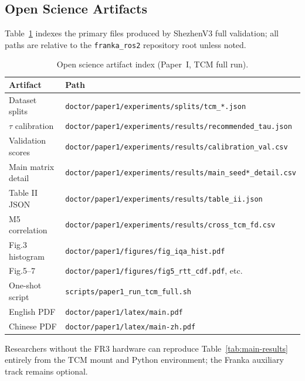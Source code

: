 \subsection{Open Science Artifacts}
\label{sec:artifacts}

Table~\ref{tab:artifacts} indexes the primary files produced by ShezhenV3 full validation; all paths are relative to the \texttt{franka\_ros2} repository root unless noted.

\begin{table}[t]
\centering
\caption{Open science artifact index (Paper~I, TCM full run).}
\label{tab:artifacts}
\scriptsize
\begin{tabular}{ll}
\hline
Artifact & Path \\
\hline
Dataset splits & \texttt{doctor/paper1/experiments/splits/tcm\_*.json} \\
$\tau$ calibration & \texttt{doctor/paper1/experiments/results/recommended\_tau.json} \\
Validation scores & \texttt{doctor/paper1/experiments/results/calibration\_val.csv} \\
Main matrix detail & \texttt{doctor/paper1/experiments/results/main\_seed*\_detail.csv} \\
Table II JSON & \texttt{doctor/paper1/experiments/results/table\_ii.json} \\
M5 correlation & \texttt{doctor/paper1/experiments/results/cross\_tcm\_fd.csv} \\
Fig.3 histogram & \texttt{doctor/paper1/figures/fig\_iqa\_hist.pdf} \\
Fig.5--7 & \texttt{doctor/paper1/figures/fig5\_rtt\_cdf.pdf}, etc. \\
One-shot script & \texttt{scripts/paper1\_run\_tcm\_full.sh} \\
English PDF & \texttt{doctor/paper1/latex/main.pdf} \\
Chinese PDF & \texttt{doctor/paper1/latex/main-zh.pdf} \\
\hline
\end{tabular}
\end{table}

Researchers without the FR3 hardware can reproduce Table~\ref{tab:main-results} entirely from the TCM mount and Python environment; the Franka auxiliary track remains optional.
